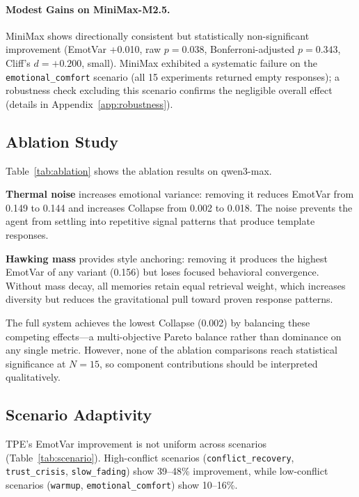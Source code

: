 \paragraph{Modest Gains on MiniMax-M2.5.} MiniMax shows directionally consistent but statistically non-significant improvement (EmotVar +0.010, raw $p = 0.038$, Bonferroni-adjusted $p = 0.343$, Cliff's $d = +0.200$, small). MiniMax exhibited a systematic failure on the \texttt{emotional\_comfort} scenario (all 15 experiments returned empty responses); a robustness check excluding this scenario confirms the negligible overall effect (details in Appendix~\ref{app:robustness}).

\subsection{Ablation Study}
\label{sec:ablation}

Table~\ref{tab:ablation} shows the ablation results on qwen3-max.



\textbf{Thermal noise} increases emotional variance: removing it reduces EmotVar from 0.149 to 0.144 and increases Collapse from 0.002 to 0.018. The noise prevents the agent from settling into repetitive signal patterns that produce template responses.

\textbf{Hawking mass} provides style anchoring: removing it produces the highest EmotVar of any variant (0.156) but loses focused behavioral convergence. Without mass decay, all memories retain equal retrieval weight, which increases diversity but reduces the gravitational pull toward proven response patterns.

The full system achieves the lowest Collapse (0.002) by balancing these competing effects---a multi-objective Pareto balance rather than dominance on any single metric. However, none of the ablation comparisons reach statistical significance at $N = 15$, so component contributions should be interpreted qualitatively.

\subsection{Scenario Adaptivity}

TPE's EmotVar improvement is not uniform across scenarios (Table~\ref{tab:scenario}). High-conflict scenarios (\texttt{conflict\_recovery}, \texttt{trust\_crisis}, \texttt{slow\_fading}) show 39--48\% improvement, while low-conflict scenarios (\texttt{warmup}, \texttt{emotional\_comfort}) show 10--16\%.

